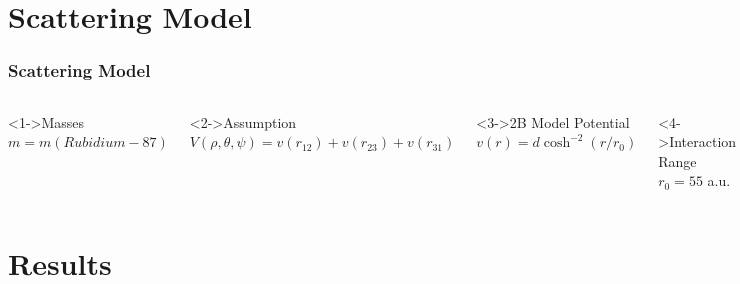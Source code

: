 \documentclass[hideothersubsections]{beamer}
\begin{document}
\section{Scattering Model}
\begin{frame}
\frametitle{Scattering Model}
\begin{columns}
\begin{block}<1->{Masses} 
	$m = m(Rubidium-87)$
\end{block}
\begin{block}<2->{Assumption}
	$V(\rho,\theta,\psi) = v(r_{12}) + v(r_{23}) + v(r_{31})$
\end{block}
\begin{block}<3->{2B Model Potential}
	$v(r) = d\cosh^{-2}{(r/r_0)}$
\end{block}
\begin{block}<4->{Interaction Range}
	$r_0 = 55$ a.u.
\end{block}
	\includegraphics[width=1.0\linewidth]{scattering_new.pdf}
\end{columns}
\end{frame}

\section{Results}
\end{document}
